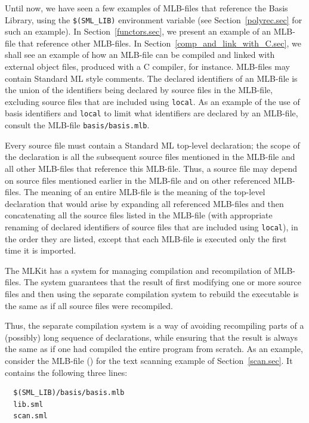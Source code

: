 \documentclass[12pt]{book}
\begin{document}
Until now, we have seen a few examples of MLB-files that reference the
Basis Library, using the \texttt{\$(SML\_LIB)} environment variable
(see Section~\ref{polyrec.sec} for such an example). In
Section~\ref{functors.sec}, we present an example of an MLB-file that
reference other MLB-files. In Section~\ref{comp_and_link_with_C.sec},
we shall see an example of how an MLB-file can be compiled and linked
with external object files, produced with a C compiler, for instance.
MLB-files may contain Standard ML style
%
%
comments. The declared identifiers of an MLB-file is the union of the
identifiers being declared by source files in the MLB-file, excluding
source files that are included using {\tt local}. As an example of the
use of basis identifiers and {\tt local} to limit what identifiers are
declared by an MLB-file, consult the MLB-file {\tt basis/basis.mlb}.

Every source file must contain a Standard ML top-level declaration;
the scope of the declaration is all the subsequent source files
mentioned in the MLB-file and all other MLB-files that reference this
MLB-file. Thus, a source file may depend on source files mentioned
earlier in the MLB-file and on other referenced MLB-files.  The
meaning of an entire MLB-file is the meaning of the top-level
declaration that would arise by expanding all referenced MLB-files and
then concatenating all the source files listed in the MLB-file (with
appropriate renaming of declared identifiers of source files that are
included using {\tt local}), in the order they are listed, except that
each MLB-file is executed only the first time it is imported.

The MLKit has a system for managing compilation and recompilation of
%
MLB-files.  The system guarantees that the result of first modifying
one or more source files and then using the separate
compilation system to rebuild the executable is the same as if all 
%
source files were
%
recompiled.

Thus, the separate compilation system is a way of avoiding recompiling
parts of a (possibly) long sequence of declarations, while ensuring
that the result is always the same as if one had compiled the entire
program from scratch.  As an example, consider the MLB-file
() for the text scanning example of
Section~\ref{scan.sec}. It contains the following three lines:
\begin{verbatim}
  $(SML_LIB)/basis/basis.mlb
  lib.sml
  scan.sml
\end{verbatim}
\end{document}
